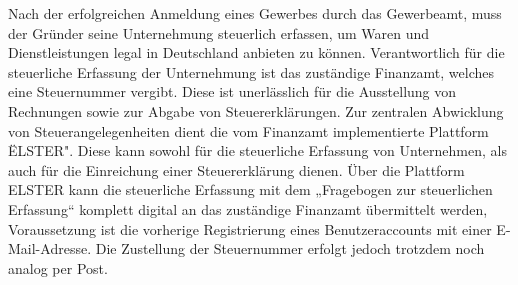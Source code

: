 Nach der erfolgreichen Anmeldung eines Gewerbes durch das Gewerbeamt, muss der Gründer seine Unternehmung steuerlich erfassen, um Waren und Dienstleistungen legal in Deutschland anbieten zu können.
 Verantwortlich für die steuerliche Erfassung der Unternehmung ist das zuständige Finanzamt, welches eine Steuernummer vergibt. Diese ist unerlässlich für die Ausstellung von Rechnungen sowie zur Abgabe von Steuererklärungen. 
 Zur zentralen Abwicklung von Steuerangelegenheiten dient die vom Finanzamt implementierte Plattform \"ELSTER".
 Diese kann sowohl für die steuerliche Erfassung von Unternehmen, als auch für die Einreichung einer Steuererklärung dienen. 
 Über die Plattform ELSTER kann die steuerliche Erfassung mit dem „Fragebogen zur steuerlichen Erfassung“ komplett digital an das zuständige Finanzamt übermittelt werden, Voraussetzung ist die vorherige Registrierung eines Benutzeraccounts mit einer E-Mail-Adresse. 
 Die Zustellung der Steuernummer erfolgt jedoch trotzdem noch analog per Post. 
